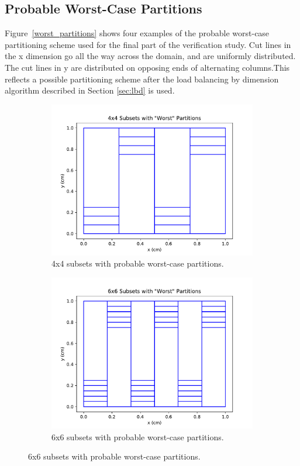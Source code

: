 \subsection{Probable Worst-Case Partitions}
Figure~\ref{worst_partitions} shows four examples of the probable worst-case partitioning scheme used for the final part of the verification study. Cut lines in the x dimension go all the way across the domain, and are uniformly distributed. The cut lines in y are distributed on opposing ends of alternating columns.This reflects a possible partitioning scheme after the load balancing by dimension algorithm described in Section \ref{sec:lbd} is used.
\begin{figure}[H]
\centering
\begin{subfigure}[b]{0.45\textwidth}
  \includegraphics[width=\textwidth]{../cut_line_files/4_worst.pdf}
  \caption{4x4 subsets with probable worst-case partitions.}
  \label{4worst}
\end{subfigure}
\begin{subfigure}[b]{0.45\textwidth}
  \includegraphics[width=\textwidth]{../cut_line_files/6_worst.pdf}
  \caption{6x6 subsets with probable worst-case partitions.}
  \label{6worst}
\end{subfigure}


\end{figure}
